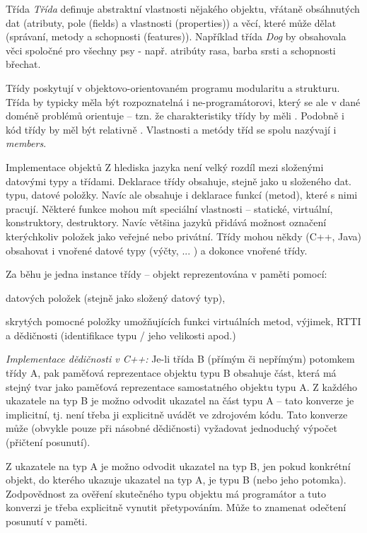\begin{obecne}{Třída}
\emph{Třída} definuje abstraktní vlastnosti nějakého objektu, vřátaně obsáhnutých dat (atributy, pole (fields) a vlastnosti (properties)) a věcí, které může dělat (správaní, metody a schopnosti (features)). Například třída \emph{Dog} by obsahovala věci spoločné pro všechny psy - např. atribúty rasa, barba srsti a schopnosti břechat. %
 

Třídy poskytují v objektovo-orientovaném programu modularitu a strukturu. Třída by typicky měla být rozpoznatelná i ne-programátorovi, který se ale v dané doméně problémů orientuje -- tzn. že charakteristiky třídy by měli . Podobně i kód třídy by měl být relativně . Vlastnosti a metódy tříd se spolu nazývají i \emph{members}.
\end{obecne}

\begin{obecne}{Implementace objektů}
Z hlediska jazyka není velký rozdíl mezi složenými datovými typy a třídami. Deklarace třídy obsahuje, stejně jako u složeného dat. typu, datové položky. Navíc ale obsahuje i deklarace funkcí (metod), které s nimi pracují. Některé funkce mohou mít speciální vlastnosti -- statické, virtuální, konstruktory, destruktory. Navíc většina jazyků přidává možnost označení kterýchkoliv položek jako veřejné nebo privátní. Třídy mohou někdy (C++, Java) obsahovat i vnořené datové typy (výčty, ... ) a dokonce vnořené třídy.

Za běhu je jedna instance třídy -- objekt reprezentována v paměti pomocí:
\begin{pitemize}
    \item datových položek (stejně jako složený datový typ),
    \item skrytých pomocné položky umožňujících funkci virtuálních metod, výjimek, RTTI a dědičnosti (identifikace typu / jeho velikosti apod.)
\end{pitemize}

\emph{Implementace dědičnosti v C++:} Je-li třída B (přímým či nepřímým) potomkem třídy A, pak paměťová reprezentace objektu typu B obsahuje část, která má stejný tvar jako paměťová reprezentace samostatného objektu typu A. Z každého ukazatele na typ B je možno odvodit ukazatel na část typu A -- tato konverze je implicitní, tj. není třeba ji explicitně uvádět ve zdrojovém kódu. Tato konverze může (obvykle pouze při násobné dědičnosti) vyžadovat jednoduchý výpočet (přičtení posunutí).

Z ukazatele na typ A je možno odvodit ukazatel na typ B, jen pokud konkrétní objekt, do kterého ukazuje ukazatel na typ A, je typu B (nebo jeho potomka). Zodpovědnost za ověření skutečného typu objektu má programátor a tuto konverzi je třeba explicitně vynutit přetypováním. Může to znamenat odečtení posunutí v paměti.
\end{obecne}

